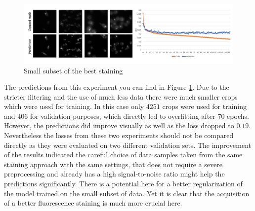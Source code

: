 \begin{figure}[htb]
	\begin{center}
		\includegraphics[width=\linewidth]{bilder/golgi/12-13/12-13.png}
		\caption{Small subset of the best staining}\label{fig:12-13}
	\end{center}
\end{figure}

The predictions from this experiment you can find in Figure \ref{fig:12-13}. Due to the stricter filtering and the use of much less data there were much smaller crops which were used for training. In this case only $4251$ crops were used for training and $406$ for validation purposes, which directly led to overfitting after $70$ epochs. However, the predictions did improve visually as well as the loss dropped to $0.19$. Nevertheless the losses from these two experiments should not be compared directly as they were evaluated on two different validation sets. The improvement of the results indicated the careful choice of data samples taken from the same staining approach with the same settings, that does not require a severe preprocessing and already has a high signal-to-noise ratio might help the predictions significantly. There is a potential here for a better regularization of the model trained on the small subset of data. Yet it is clear that the acquisition of a better fluorescence staining is much more crucial here.